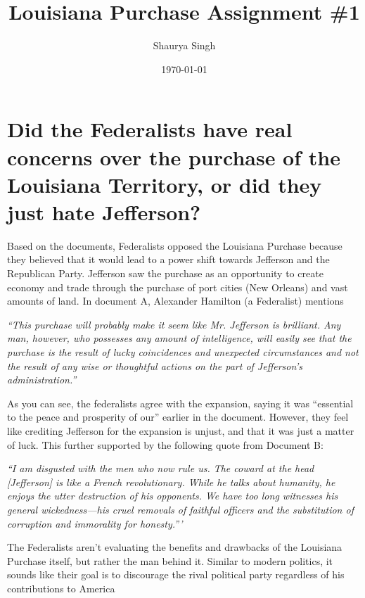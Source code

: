 \documentclass{scrartcl}
\author{Shaurya Singh}
\date{\today}
\title{Louisiana Purchase Assignment \#1}
\begin{document}
\maketitle

\section{Did the Federalists have real concerns over the purchase of the Louisiana Territory, or did they just hate Jefferson?}
\label{sec:orgbbb7887}
Based on the documents, Federalists opposed the Louisiana Purchase because they
  believed that it would lead to a power shift towards Jefferson and
  the Republican Party. Jefferson saw the purchase as an opportunity to create
  economy and trade through the purchase of port cities (New Orleans) and vast
  amounts of land. In document A, Alexander Hamilton (a Federalist) mentions

\emph{``This purchase will probably make it seem like Mr. Jefferson is brilliant. Any man, however, who possesses any amount of intelligence, will easily see that the purchase is the result of lucky coincidences and unexpected circumstances and not the result of any wise or thoughtful actions on the part of Jefferson’s administration.''}

As you can see, the federalists agree with the expansion, saying it was
``essential to the peace and prosperity of our'' earlier in the document.
However, they feel like crediting Jefferson for the expansion is unjust, and
that it was just a matter of luck. This further supported by the following quote from
Document B:

\emph{``I am disgusted with the men who now rule us. The coward at the head [Jefferson] is like a French revolutionary. While he talks about humanity, he enjoys the utter destruction of his opponents. We have too long witnesses his general wickedness—his cruel removals of faithful officers and the substitution of corruption and immorality for honesty.'''}

The Federalists aren't evaluating the benefits and drawbacks of the Louisiana
Purchase itself, but rather the man behind it. Similar to modern politics, it
sounds like their goal is to discourage the rival political party regardless of
his contributions to America
\end{document}
